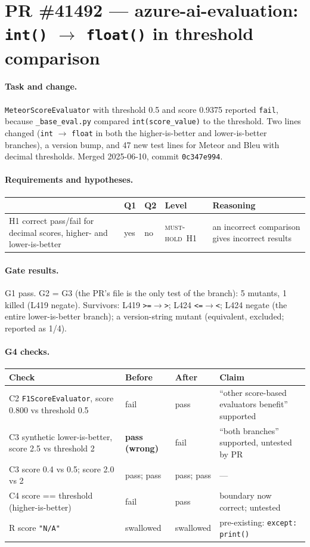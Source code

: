 \documentclass[11pt,a4paper]{article}
\newcommand{\code}[1]{\texttt{#1}}
\newcommand{\musthold}{\textsc{must-hold}}
\newcommand{\card}[1]{\clearpage\section{#1}}
\newcommand{\sub}[1]{\paragraph{#1}}
\begin{document}
\card{PR \#41492 — azure-ai-evaluation: \code{int()} $\to$ \code{float()} in threshold comparison}

\sub{Task and change.} \code{MeteorScoreEvaluator} with threshold 0.5 and score 0.9375 reported \code{fail}, because \code{\_base\_eval.py} compared \code{int(score\_value)} to the threshold. Two lines changed (\code{int} $\to$ \code{float} in both the higher-is-better and lower-is-better branches), a version bump, and 47 new test lines for Meteor and Bleu with decimal thresholds. Merged 2025-06-10, commit \code{0c347e994}.

\sub{Requirements and hypotheses.}
\begin{center}\small\begin{tabularx}{\textwidth}{p{} l l l X}
\toprule & Q1 & Q2 & Level & Reasoning \\ \midrule
H1 correct pass/fail for decimal scores, higher- and lower-is-better & yes & no & \musthold\ H1 & an incorrect comparison gives incorrect results \\
\bottomrule\end{tabularx}\end{center}

\sub{Gate results.} G1 pass. G2 = G3 (the PR's file is the only test of the branch): 5 mutants, 1 killed (L419 negate). Survivors: L419 \code{>=$\to$>}; L424 \code{<=$\to$<}; L424 negate (the entire lower-is-better branch); a version-string mutant (equivalent, excluded; reported as 1/4).

\sub{G4 checks.}
\begin{center}\small\begin{tabularx}{\textwidth}{X l l X}
\toprule Check & Before & After & Claim \\ \midrule
C2 \code{F1ScoreEvaluator}, score 0.800 vs threshold 0.5 & fail & pass & ``other score-based evaluators benefit'' supported \\
C3 synthetic lower-is-better, score 2.5 vs threshold 2 & \textbf{pass (wrong)} & fail & ``both branches'' supported, untested by PR \\
C3 score 0.4 vs 0.5; score 2.0 vs 2 & pass; pass & pass; pass & --- \\
C4 score == threshold (higher-is-better) & fail & pass & boundary now correct; untested \\
R score \code{"N/A"} & swallowed & swallowed & pre-existing: \code{except: print()} \\
\bottomrule\end{tabularx}\end{center}
\end{document}
